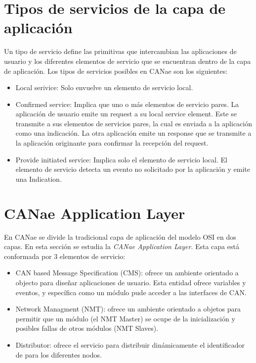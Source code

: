 \section{Tipos de servicios de la capa de aplicación}
Un tipo de servicio define las primitivas que intercambian las aplicaciones de usuario y los diferentes elementos de servicio que se encuentran dentro de la capa de aplicación. Los tipos de servicios posibles en CANae son los siguientes:
\begin{itemize}
\item Local serivice: Solo envuelve un elemento de servicio local. 

\item Confirmed service: Implica que uno o más elementos de servicio pares. La aplicación de usuario emite un request a su local service element. Este se transmite a sus elementos de servicios pares, la cual es enviada a la aplicación como una indicación. La otra aplicación emite un response que se transmite a la aplicación originante para confirmar la recepción del request. 

\item Provide initiated service: Implica solo el elemento de servicio local. El elemento de servicio detecta un evento no solicitado por la aplicación y emite una Indication. 
  
\end{itemize}

\section{CANae Application Layer}
En CANae se divide la tradicional capa de aplicación del modelo OSI en dos capas. En esta sección se estudia la \textit{CANae Application Layer}. Esta capa está conformada por 3 elementos de servicio:
\begin{itemize}
\item CAN based Message Specification (CMS): ofrece un ambiente orientado a objecto para diseñar aplicaciones de usuario. Esta entidad ofrece variables y eventos, y específica como un módulo pude acceder a las interfaces de CAN.
\item Network Managment (NMT): ofrece un ambiente orientado a objetos para permitir que un módulo (el NMT Master) se ocupe de la inicialización y posibles fallas  de otros módulos (NMT Slaves).
\item Distributor: ofrece el servicio para distribuir dinámicamente el identificador de para los diferentes nodos. 
\end{itemize}

